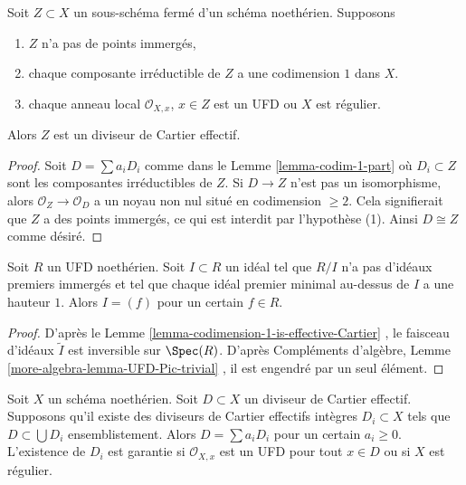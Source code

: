 \begin{lemma}
\label{lemma-codimension-1-is-effective-Cartier}
Soit  $Z \subset X$  un sous-schéma fermé d'un schéma noethérien. Supposons
\begin{enumerate}
\item $Z$  n'a pas de points immergés,
\item chaque composante irréductible de  $Z$  a une codimension  $1$  dans
 $X$.
\item chaque anneau local  $\mathcal{O}_{X, x}$,  $x \in Z$  est un UFD ou  $X$  est
régulier.
\end{enumerate}
Alors  $Z$  est un diviseur de Cartier effectif.
\end{lemma}

\begin{proof}
Soit  $D = \sum a_i D_i$  comme dans le Lemme  \ref{lemma-codim-1-part}  où  $D_i \subset Z$  sont les
composantes irréductibles de  $Z$. Si  $D \to Z$  n'est pas un
isomorphisme, alors  $\mathcal{O}_Z \to \mathcal{O}_D$  a un noyau non nul situé en codimension
 $\geq 2$. Cela signifierait que  $Z$  a des points immergés, ce qui
est interdit par l'hypothèse (1). Ainsi  $D \cong Z$  comme désiré.
\end{proof}

\begin{lemma}
\label{lemma-UFD-one-equation-CM}
Soit  $R$  un UFD noethérien. Soit  $I \subset R$  un idéal tel que
 $R/I$  n'a pas d'idéaux premiers immergés et tel que chaque idéal premier minimal
au-dessus de  $I$  a une hauteur  $1$. Alors  $I = (f)$  pour un
certain  $f \in R$.
\end{lemma}

\begin{proof}
D'après le Lemme  \ref{lemma-codimension-1-is-effective-Cartier} , le faisceau d'idéaux  $\tilde I$  est inversible
sur  $\Spec(R)$. D'après Compléments d'algèbre, Lemme  \ref{more-algebra-lemma-UFD-Pic-trivial} , il est engendré
par un seul élément.
\end{proof}

\begin{lemma}
\label{lemma-effective-Cartier-divisor-is-a-sum}
Soit  $X$  un schéma noethérien. Soit  $D \subset X$  un diviseur de Cartier
effectif. Supposons qu'il existe des diviseurs de Cartier effectifs intègres
 $D_i \subset X$  tels que  $D \subset \bigcup D_i$  ensemblistement. Alors
 $D = \sum a_i D_i$  pour un certain  $a_i \geq 0$. L'existence de  $D_i$  est
garantie si  $\mathcal{O}_{X, x}$  est un UFD pour tout  $x \in D$  ou si  $X$  est
régulier.
\end{lemma}

